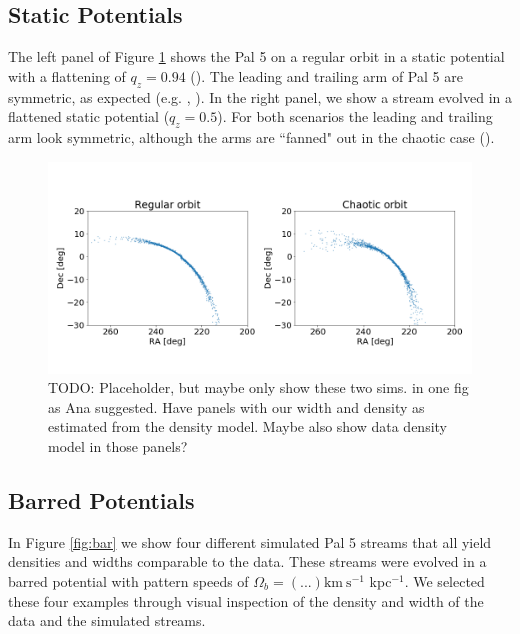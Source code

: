 \documentclass[modern]{aastex62}
\newcommand{\kms}{\ensuremath{\textrm{km}~\textrm{s}^{-1}}}
\newcommand{\todo}[1]{{\color{red} TODO: #1}}
\begin{document}
\subsection{Static Potentials}
\label{sec:results_stat}
The left panel of Figure \ref{fig:static} shows the Pal 5 on a regular orbit in a static potential with a flattening of $q_z = 0.94$ (\citealt{bovy:2017}). The leading and trailing arm of Pal 5 are symmetric, as expected (e.g. \citealt{dehnen:2004}, \citealt{Pearson:2015}). In the right panel, we show a stream evolved in a flattened static potential ($q_z = 0.5$). For both scenarios the leading and trailing arm look symmetric, although the arms are ``fanned" out in the chaotic case (\citealt{Price-Whelan:2016}). 

\begin{figure}
\centerline{\includegraphics[width=\columnwidth]{static.png}}
\caption{\todo{Placeholder, but maybe only show these two sims. in one fig as Ana suggested. Have panels with our width and density as estimated from the density model. Maybe also show data density model in those panels?}}
\label{fig:static}
\end{figure}




\subsection{Barred Potentials}
\label{sec:results_barred}
In Figure \ref{fig:bar} we show four different simulated Pal 5 streams that all yield densities and widths comparable to the data. These streams were evolved in a barred potential with pattern speeds of $\Omega_b = (...) \kms$ kpc$^{-1}$. We selected these four examples through visual inspection of the density and width of the data and the simulated streams. 
\end{document}
